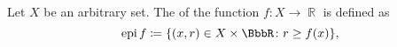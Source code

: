 \begin{definition}\label{def:epigraph}
  Let \( X \) be an arbitrary set. The  of the function \( f: X \to \BbbR \) is defined as
  \begin{equation*}
    \epi f \coloneqq \{ (x, r) \in X \times \BbbR \colon r \geq f(x) \},
  \end{equation*}
\end{definition}

\begin{definition}\label{def:vector_field}
\end{definition}

\begin{theorem}\label{thm:intermedaite_value_theorem}
\end{theorem}
